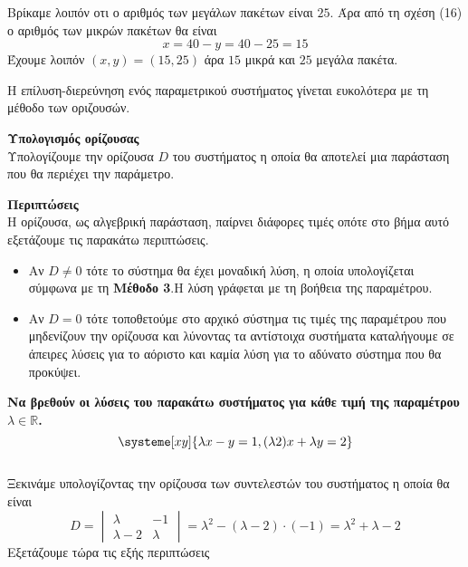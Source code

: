 \documentclass[twoside,nofonts,internet,methodoi]{thewria}
\begin{document}
Βρίκαμε λοιπόν οτι ο αριθμός των μεγάλων πακέτων είναι $ 25 $. Άρα από τη σχέση (16) ο αριθμός των μικρών πακέτων θα είναι
\[ x=40-y=40-25=15 \]
Έχουμε λοιπόν $ (x,y)=(15,25) $ άρα $ 15 $ μικρά και $ 25 $ μεγάλα πακέτα.
\begin{Methodos}
Η επίλυση-διερεύνηση ενός παραμετρικού συστήματος γίνεται ευκολότερα με τη μέθοδο των οριζουσών.
\begin{bhma}
\item \textbf{Υπολογισμός ορίζουσας}\\
Υπολογίζουμε την ορίζουσα $ D $ του συστήματος η οποία θα αποτελεί μια παράσταση που θα περιέχει την παράμετρο.
\item \textbf{Περιπτώσεις}\\
Η ορίζουσα, ως αλγεβρική παράσταση, παίρνει διάφορες τιμές οπότε στο βήμα αυτό εξετάζουμε τις παρακάτω περιπτώσεις.
\begin{itemize}
\item Αν $ D\neq0 $ τότε το σύστημα θα έχει μοναδική λύση, η οποία υπολογίζεται σύμφωνα με τη \textbf{Μέθοδο 3}.Η λύση γράφεται με τη βοήθεια της παραμέτρου.
\item Αν $ D=0 $ τότε τοποθετούμε στο αρχικό σύστημα τις τιμές της παραμέτρου που μηδενίζουν την ορίζουσα και λύνοντας τα αντίστοιχα συστήματα καταλήγουμε σε άπειρες λύσεις για το αόριστο και καμία λύση για το αδύνατο σύστημα που θα προκύψει.
\end{itemize}
\end{bhma}
\end{Methodos}
\textbf{Να βρεθούν οι λύσεις του παρακάτω συστήματος για κάθε τιμή της παραμέτρου {\boldmath$ {\lambda\in\mathbb{R}} $}.}
{\boldmath\[ \systeme[xy]{\lambda x-y=1,(\lambda\-2)x+\lambda y=2} \]}
\lysh\\
Ξεκινάμε υπολογίζοντας την ορίζουσα των συντελεστών του συστήματος η οποία θα είναι
\[ D=\begin{vmatrix}
\lambda & -1\\\lambda-2 & \lambda
\end{vmatrix}=\lambda^2-(\lambda-2)\cdot(-1)=\lambda^2+\lambda-2 \]
Εξετάζουμε τώρα τις εξής περιπτώσεις
\end{document}
